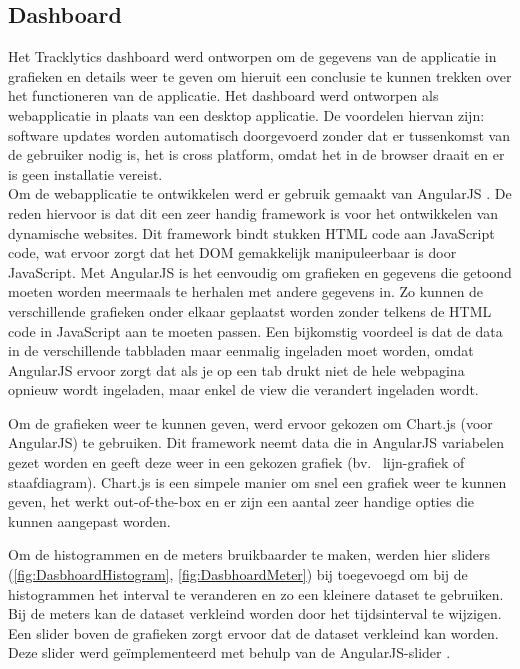 \subsection{Dashboard}\label{visualisatie}
Het Tracklytics dashboard werd ontworpen om de gegevens van de applicatie in grafieken en details weer te geven om hieruit een conclusie te kunnen trekken over het functioneren van de applicatie. Het dashboard werd ontworpen als webapplicatie in plaats van een desktop applicatie. De voordelen hiervan zijn: software updates worden automatisch doorgevoerd zonder dat er tussenkomst van de gebruiker nodig is, het is cross platform, omdat het in de browser draait en er is geen installatie vereist. \\

Om de webapplicatie te ontwikkelen werd er gebruik gemaakt van AngularJS \cite{AngularJS}. De reden hiervoor is dat dit een zeer handig framework is voor het ontwikkelen van dynamische websites. Dit framework bindt stukken HTML code aan JavaScript code, wat ervoor zorgt dat het DOM gemakkelijk manipuleerbaar is door JavaScript.
Met AngularJS is het eenvoudig om grafieken en gegevens die getoond moeten worden meermaals te herhalen met andere gegevens in. Zo kunnen de verschillende grafieken onder elkaar geplaatst worden zonder telkens de HTML code in JavaScript aan te moeten passen. Een bijkomstig voordeel is dat de data in de verschillende tabbladen maar eenmalig ingeladen moet worden, omdat AngularJS ervoor zorgt dat als je op een tab drukt niet de hele webpagina opnieuw wordt ingeladen, maar enkel de view die verandert ingeladen wordt.

Om de grafieken weer te kunnen geven, werd ervoor gekozen om Chart.js\cite{ChartJS} (voor AngularJS) te gebruiken. Dit framework neemt data die in AngularJS variabelen gezet worden en geeft deze weer in een gekozen grafiek (bv.~ lijn-grafiek of staafdiagram). Chart.js is een simpele manier om snel een grafiek weer te kunnen geven, het werkt out-of-the-box en er zijn een aantal zeer handige opties die kunnen aangepast worden. 

Om de histogrammen en de meters bruikbaarder te maken, werden hier sliders (\ref{fig:DasbhoardHistogram}, \ref{fig:DasbhoardMeter}) bij toegevoegd om bij de histogrammen het interval te veranderen en zo een kleinere dataset te gebruiken. Bij de meters kan de dataset verkleind worden door het tijdsinterval te wijzigen. Een slider boven de grafieken zorgt ervoor dat de dataset verkleind kan worden. Deze slider werd ge\"implementeerd met behulp van de AngularJS-slider \cite{AngularSlider}.\\


